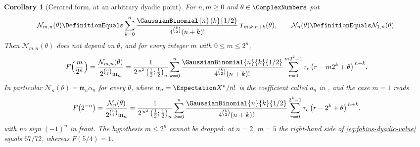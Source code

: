 \documentclass[11pt,a4paper,oneside,openany]{book}
\newtheorem{corollary}[corollary]{Corollary}
\theoremstyle{definition}
\theoremstyle{remark}
\begin{document}
\begin{corollary}[Centred form, at an arbitrary dyadic point]\label{cor:fabius-centered-formula}
For $n,m\ge0$ and $\theta\in\ComplexNumbers$ put
\begin{equation}\label{eq:dyadic-numerator}
 \mathcal N_{m,n}(\theta)
 \DefinitionEquals\sum_{k=0}^{n}
 \frac{\GaussianBinomial{n}{k}{1/2}}{4^{\binom k2}(n+k)!}\,T_{m;k,n+k}(\theta),
 \qquad
 \mathcal N_n(\theta)\DefinitionEquals\mathcal N_{1,n}(\theta).
\end{equation}
Then $\mathcal N_{m,n}(\theta)$ does not depend on $\theta$, and for every integer $m$
with $0\le m\le2^n$,
\begin{equation}\label{eq:fabius-dyadic-value}
 F\!\left(\frac m{2^n}\right)
 =\frac{\mathcal N_{m,n}(\theta)}{2^{\binom n2}\mathfrak m_n}
 =\frac1{2^{\,n^2}\left(\frac12;\frac12\right)_n}
 \sum_{k=0}^{n}
 \frac{\GaussianBinomial{n}{k}{1/2}}{4^{\binom k2}(n+k)!}
 \sum_{r=0}^{m2^k-1}\tau_r\,\bigl(r-m2^k+\theta\bigr)^{\,n+k}.
\end{equation}
In particular $\mathcal N_n(\theta)=\mathfrak m_n\alpha_n$ for every $\theta$, where
$\alpha_n=\Expectation X^n/n!$ is the coefficient called $a_n$ in
, and the case $m=1$ reads
\begin{equation}\label{eq:fabius-centered-formula}
 F\bigl(2^{-n}\bigr)
 =\frac{\mathcal N_n(\theta)}{2^{\binom n2}\mathfrak m_n}
 =\frac1{2^{\,n^2}\left(\frac12;\frac12\right)_n}
 \sum_{k=0}^{n}
 \frac{\GaussianBinomial{n}{k}{1/2}}{4^{\binom k2}(n+k)!}
 \sum_{r=0}^{2^k-1}\tau_r\,\bigl(r-2^k+\theta\bigr)^{\,n+k},
\end{equation}
with no sign $(-1)^n$ in front.  The hypothesis $m\le2^n$ cannot be dropped: at
$n=2$, $m=5$ the right-hand side of \eqref{eq:fabius-dyadic-value} equals $67/72$,
whereas $F(5/4)=1$.
\end{corollary}
\end{document}
